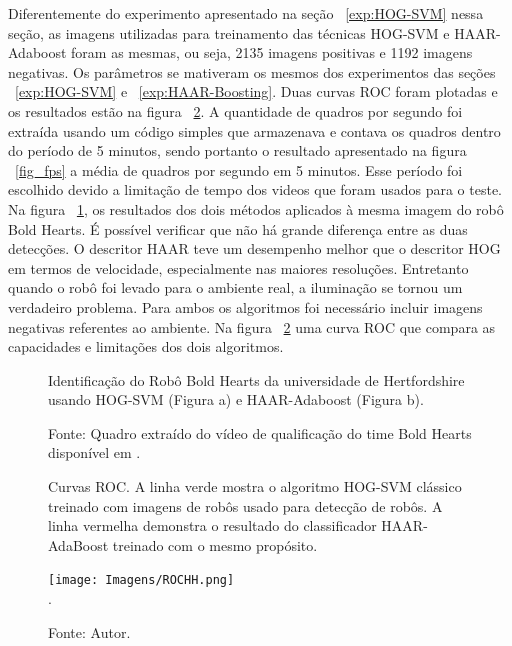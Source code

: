 Diferentemente do experimento apresentado na seção ~\ref{exp:HOG-SVM} nessa seção, as imagens utilizadas para treinamento das técnicas HOG-SVM e HAAR-Adaboost foram as mesmas, ou seja, 2135 imagens positivas e 1192 imagens negativas. Os parâmetros se mativeram os mesmos dos experimentos das seções ~\ref{exp:HOG-SVM} e ~\ref{exp:HAAR-Boosting}.
Duas curvas ROC foram plotadas e os resultados estão na figura ~\ref{fig_rocHH}. A quantidade de quadros por segundo foi extraída usando um código simples que armazenava e contava os quadros dentro do período de 5 minutos, sendo portanto o resultado apresentado na figura ~\ref{fig_fps} a média de quadros por segundo em 5 minutos. Esse período foi escolhido devido a limitação de tempo dos videos que foram usados para o teste. Na figura ~\ref{fig_He}, os resultados dos dois métodos aplicados à mesma imagem do robô Bold Hearts. É possível verificar que não há grande diferença entre as duas detecções.
O descritor HAAR teve um desempenho melhor que o descritor HOG em termos de velocidade, especialmente nas maiores resoluções. Entretanto quando o robô foi levado para o ambiente real, a iluminação se tornou um verdadeiro problema. Para ambos os algoritmos foi necessário incluir imagens negativas referentes ao ambiente. Na figura ~\ref{fig_rocHH} uma curva ROC que compara as capacidades e limitações dos dois algoritmos. 

\begin{figure}[!h!t]%
    \centering  \caption{Identificação do Robô Bold Hearts \cite{Bold} da universidade de Hertfordshire usando HOG-SVM (Figura a) e HAAR-Adaboost (Figura b).}%
    \qquad
\caption*{Fonte: Quadro extraído do vídeo de qualificação do time Bold Hearts \cite{Bold} disponível em .}
    \label{fig_He}%
\end{figure}

\begin{figure}[!h!t!]
\centering \caption{Curvas ROC. A linha verde mostra o algoritmo HOG-SVM clássico treinado com imagens de robôs usado para detecção de robôs.
A linha vermelha demonstra o resultado do classificador HAAR-AdaBoost treinado com o mesmo propósito.}
\texttt{[image: Imagens/ROCHH.png]}\\
\DeclareGraphicsExtensions.
\caption*{Fonte: Autor.}
\label{fig_rocHH}
\end{figure}

